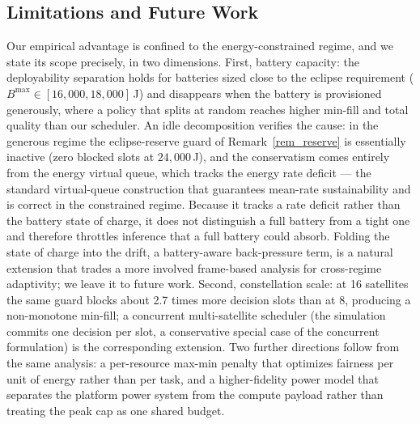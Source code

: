 \subsection{Limitations and Future Work}\label{EV_LIM}
Our empirical advantage is confined to the energy-constrained regime, and we
state its scope precisely, in two dimensions. First, battery capacity: the
deployability separation holds for batteries sized close to the eclipse
requirement ($B^{\max}\!\in\![16{,}000,18{,}000]$\,J) and disappears when the
battery is provisioned generously, where a policy that splits at random reaches
higher min-fill and total quality than our scheduler. An idle decomposition
verifies the cause: in the generous regime the eclipse-reserve guard of
Remark~\ref{rem_reserve} is essentially inactive (zero blocked slots at
$24{,}000$\,J), and the conservatism comes entirely from the energy virtual
queue, which tracks the energy rate deficit — the standard virtual-queue
construction that guarantees mean-rate sustainability and is correct in the
constrained regime. Because it tracks a rate deficit rather than the battery
state of charge, it does not distinguish a full battery from a tight one and
therefore throttles inference that a full battery could absorb. Folding the
state of charge into the drift, a battery-aware back-pressure term, is a
natural extension that trades a more involved frame-based analysis for
cross-regime adaptivity; we leave it to future work. Second, constellation
scale: at 16 satellites the same guard blocks about 2.7 times more decision
slots than at 8, producing a non-monotone min-fill; a concurrent multi-satellite
scheduler (the simulation commits one decision per slot, a conservative special
case of the concurrent formulation) is the corresponding extension. Two further
directions follow from the same analysis: a per-resource max-min penalty that
optimizes fairness per unit of energy rather than per task, and a
higher-fidelity power model that separates the platform power system from the
compute payload rather than treating the peak cap as one shared budget.

